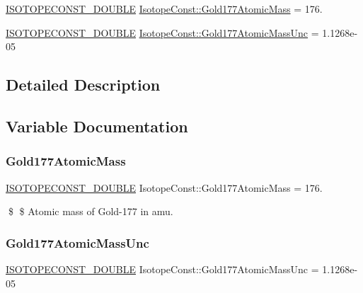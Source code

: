 \begin{DoxyCompactItemize}
\item 
\mbox{\hyperlink{group___isotope_const-_macros_ga8f45a7272ce02c0b4c65c44636ed719a}{I\+S\+O\+T\+O\+P\+E\+C\+O\+N\+S\+T\+\_\+\+D\+O\+U\+B\+LE}} \mbox{\hyperlink{group___isotope_const-_gold-_au177_gaff2f1ef167553235e28aa0f9cdf7713f}{Isotope\+Const\+::\+Gold177\+Atomic\+Mass}} = 176.
\item 
\mbox{\hyperlink{group___isotope_const-_macros_ga8f45a7272ce02c0b4c65c44636ed719a}{I\+S\+O\+T\+O\+P\+E\+C\+O\+N\+S\+T\+\_\+\+D\+O\+U\+B\+LE}} \mbox{\hyperlink{group___isotope_const-_gold-_au177_gad92a13a0314c06581aa51b144f5583e8}{Isotope\+Const\+::\+Gold177\+Atomic\+Mass\+Unc}} = 1.\+1268e-\/05
\end{DoxyCompactItemize}


\subsection{Detailed Description}


\subsection{Variable Documentation}
\mbox{\label{group___isotope_const-_gold-_au177_gaff2f1ef167553235e28aa0f9cdf7713f}} 
\subsubsection{\texorpdfstring{Gold177\+Atomic\+Mass}{Gold177AtomicMass}}
{\footnotesize\ttfamily \mbox{\hyperlink{group___isotope_const-_macros_ga8f45a7272ce02c0b4c65c44636ed719a}{I\+S\+O\+T\+O\+P\+E\+C\+O\+N\+S\+T\+\_\+\+D\+O\+U\+B\+LE}} Isotope\+Const\+::\+Gold177\+Atomic\+Mass = 176.}

\$ \$ Atomic mass of Gold-\/177 in amu. \mbox{\label{group___isotope_const-_gold-_au177_gad92a13a0314c06581aa51b144f5583e8}} 
\subsubsection{\texorpdfstring{Gold177\+Atomic\+Mass\+Unc}{Gold177AtomicMassUnc}}
{\footnotesize\ttfamily \mbox{\hyperlink{group___isotope_const-_macros_ga8f45a7272ce02c0b4c65c44636ed719a}{I\+S\+O\+T\+O\+P\+E\+C\+O\+N\+S\+T\+\_\+\+D\+O\+U\+B\+LE}} Isotope\+Const\+::\+Gold177\+Atomic\+Mass\+Unc = 1.\+1268e-\/05}

